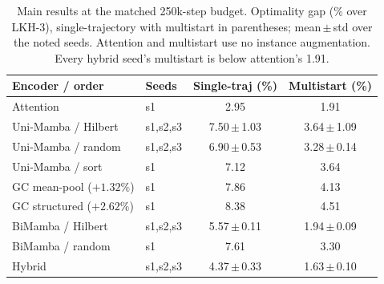 \documentclass[11pt]{article}
\newcommand{\headrow}{\rowcolor{headtint}}
\newcommand{\pct}{\%}
\begin{document}
\begin{table}[t]
\centering
\caption{Main results at the matched 250k-step budget. Optimality gap (\pct{}
over LKH-3), single-trajectory with multistart in parentheses; mean\,$\pm$\,std
over the noted seeds. Attention and multistart use no instance augmentation.
Every hybrid seed's multistart is below attention's 1.91.}
\label{tab:main}
\setlength{\tabcolsep}{5pt}
\begin{tabular}{ll cc}
\toprule
\headrow
Encoder / order & Seeds & Single-traj (\pct{}) & Multistart (\pct{}) \\
\midrule
Attention             & s1        & 2.95              & 1.91 \\
\midrule
Uni-Mamba / Hilbert   & s1,s2,s3  & 7.50\,$\pm$\,1.03 & 3.64\,$\pm$\,1.09 \\
Uni-Mamba / random    & s1,s2,s3  & 6.90\,$\pm$\,0.53 & 3.28\,$\pm$\,0.14 \\
Uni-Mamba / sort      & s1        & 7.12              & 3.64 \\
\midrule
GC mean-pool ($+1.32\pct$)      & s1 & 7.86 & 4.13 \\
GC structured ($+2.62\pct$)     & s1 & 8.38 & 4.51 \\
\midrule
BiMamba / Hilbert     & s1,s2,s3  & 5.57\,$\pm$\,0.11 & 1.94\,$\pm$\,0.09 \\
BiMamba / random      & s1        & 7.61              & 3.30 \\
\midrule
Hybrid                & s1,s2,s3  & 4.37\,$\pm$\,0.33 & 1.63\,$\pm$\,0.10 \\
\bottomrule
\end{tabular}
\end{table}
\end{document}
